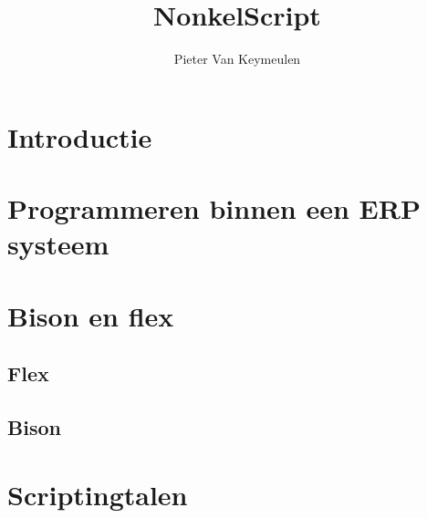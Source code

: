 \documentclass[10pt,a4paper]{article}
\author{Pieter Van Keymeulen}
\title{NonkelScript}
\begin{document}
\maketitle
\newpage

\tableofcontents
\newpage

\section{Introductie}

\section{Programmeren binnen een ERP systeem}

\section{Bison en flex}

\subsection{Flex}

\subsection{Bison}

\section{Scriptingtalen}
\end{document}
